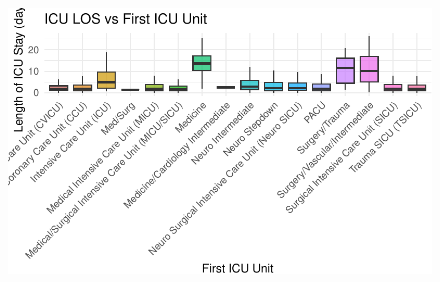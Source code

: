 \documentclass[
]{article}
\begin{document}
\begin{figure}[H]

{\centering \includegraphics{hw3_files/figure-pdf/unnamed-chunk-43-1.pdf}

}

\end{figure}
\end{document}
